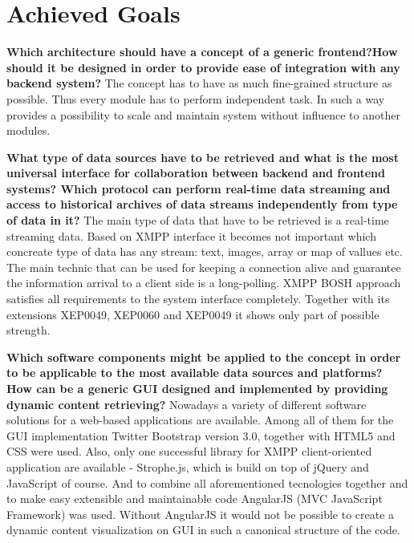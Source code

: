 \section{Achieved Goals}
	   \textbf{Which architecture should have a concept of a generic frontend?How should it be designed in order to provide ease of integration with any backend system?}
	   \newline
	   The concept has to have as much fine-grained structure as possible. Thus every module has to perform independent task. In such a way provides a possibility to scale and maintain system without influence to another modules. 

       \textbf{What type of data sources have to be retrieved and what is the most universal interface for collaboration between backend and frontend systems? Which protocol can perform real-time data streaming and access to historical archives of data streams independently from type of data in it?}
       \newline
       The main type of data that have to be retrieved is a real-time streaming data. Based on XMPP interface it becomes not important which concreate type of data has any stream: text, images, array or map of vallues etc. The main technic that can be used for keeping a connection alive and guarantee the information arrival to a client side is a long-polling. 
       \newline
       XMPP BOSH approach satisfies all requirements to the system interface completely. Together with its extensions XEP0049, XEP0060 and XEP0049 it shows only part of possible strength.

       \textbf{Which software components might be applied to the concept in order to be applicable to the most available data sources and platforms? How can be a generic GUI designed and implemented by providing dynamic content retrieving?} 
       \newline
       Nowadays a variety of different software solutions for a web-based applications are available. Among all of them for the GUI implementation Twitter Bootstrap version 3.0, together with HTML5 and CSS were used. Also, only one successful library for XMPP client-oriented application are available - Strophe.js, which is build on top of jQuery and JavaScript of course. And to combine all aforementioned tecnologies together and to make  easy extensible and maintainable code AngularJS (MVC JavaScript Framework) was used. Without AngularJS it would not be possible to create a dynamic content visualization on GUI in such a canonical structure of the code.


